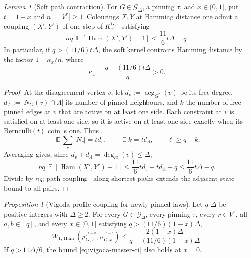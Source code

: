 \documentclass[11pt,reqno]{article}
\theoremstyle{plain}
\newtheorem{proposition}[theorem]{Proposition}
\newtheorem{lemma}[theorem]{Lemma}
\theoremstyle{definition}
\theoremstyle{remark}
\newtheorem{proposition}[proposition]{Proposition}
\newtheorem{lemma}[lemma]{Lemma}
\theoremstyle{definition}
\theoremstyle{remark}
\DeclareMathOperator{\E}{\mathbb{E}}
\DeclareMathOperator{\Ham}{Ham}
\newcommand{\Deg}{\Delta}                        %
\newcommand{\WHam}{W_{1,\Ham}}                   %
\newcommand{\colours}{[q]}                        %
\newcommand{\Gdeg}{\mathcal{G}_{\Deg}}
\newcommand{\mupin}[3]{\mu_{#1,#3}^{#2}}
\newcommand{\softK}{K}
\begin{document}
\begin{lemma}[Soft path contraction]\label{lem:soft-contraction}
For \(G\in\Gdeg\), a pinning \(\tau\), and \(x\in(0,1]\), put
\(t=1-x\) and \(n=|V^\tau|\ge1\).  Colourings \(X,Y\) at Hamming
distance one admit a coupling \((X',Y')\) of one step of
\(\softK_x^{G,\tau}\) satisfying
\begin{equation}\label{eq:soft-averaged-drift}
  nq\,\E[\Ham(X',Y')-1]\le\frac{11}{6}t\Deg-q.
\end{equation}
In particular, if \(q>(11/6)t\Deg\), the soft kernel contracts Hamming
distance by the factor \(1-\kappa_x/n\), where
\begin{equation}\label{eq:soft-kappa}
  \kappa_x=\frac{q-(11/6)t\Deg}{q}>0.
\end{equation}
\end{lemma}

\begin{proof}
At the disagreement vertex \(v\), let \(d_v:=\deg_{G^\tau}(v)\) be its
free degree, \(d_\Lambda:=|N_G(v)\cap\Lambda|\) its number of pinned
neighbours, and \(k\) the number of free--pinned edges at \(v\) that are
active on at least one side.  Each constraint at \(v\) is satisfied on at
least one side, so it is active on at least one side exactly when its
Bernoulli\((t)\) coin is one.  Thus
\[
  \E\sum_c|N_c|=td_v,\qquad \E k=td_\Lambda,
  \qquad \ell\ge q-k.
\]
Averaging  gives, since
\(d_v+d_\Lambda=\deg_G(v)\le\Deg\),
\[
  nq\,\E[\Ham(X',Y')-1]
  \le\frac{11}{6}td_v+td_\Lambda-q
  \le\frac{11}{6}t\Deg-q.
\]
Divide by \(nq\); path coupling~\cite{BubleyDyer1997} along shortest
paths extends the adjacent-state bound to all pairs.
\end{proof}

\begin{proposition}[Vigoda-profile coupling for newly pinned laws]
\label{prop:full-interval-hci}
Let \(q,\Deg\) be positive integers with \(\Deg\ge2\).  For every
\(G\in\Gdeg\), every pinning \(\tau\), every \(r\in V^\tau\), all
\(a,b\in\colours\), and every \(x\in(0,1]\) satisfying
\(q>(11/6)(1-x)\Deg\),
\begin{equation}\label{eq:vigoda-master-ci}
  \WHam\!\left(
    \mupin{G}{\tau^{r=a}}{x},\mupin{G}{\tau^{r=b}}{x}
  \right)
  \le\frac{2(1-x)\Deg}{q-(11/6)(1-x)\Deg}.
\end{equation}
If \(q>11\Deg/6\), the bound \eqref{eq:vigoda-master-ci} also holds at
\(x=0\).
\end{proposition}
\end{document}
